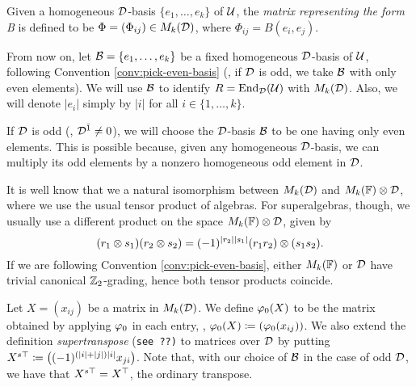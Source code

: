 \begin{defi}
    Given a homogeneous $\mathcal{D}$-basis $\{e_1, \ldots, e_k\}$ of $\mathcal U$, the \emph{matrix representing the form B} is defined to be $\Phi = (\Phi_{ij}) \in M_k(\mathcal{D})$, where $\Phi_{ij} = B(e_i, e_j)$.
\end{defi}

From now on, let $\mathcal B = \{e_1, \ldots, e_k\}$ be a fixed homogeneous $\mathcal{D}$-basis of $\mathcal U$, following Convention \ref{conv:pick-even-basis} (\ie, if $\mathcal{D}$ is odd, we take $\mathcal B$ with only even elements). 
We will use $\mathcal B$ to identify $R = \operatorname{End}_{\mathcal{D}} (\mathcal U)$ with $M_k (\mathcal{D})$. 
Also, we will denote $|e_i|$ simply by $|i|$ for all $i \in \{1, \ldots, k\}$. 



\begin{convention}\label{conv:pick-even-basis}
    If $\mathcal{D}$ is odd (\ie, $\mathcal{D}^{\bar1} \neq 0$), we will choose the $\mathcal{D}$-basis $\mathcal B$ to be one having only even elements. 
    This is possible because, given any homogeneous $\mathcal{D}$-basis, we can multiply its odd elements by a nonzero homogeneous odd element in $\mathcal{D}$. 
\end{convention}

\begin{remark}
    It is well know that we a natural isomorphism between $M_k(\mathcal{D})$ and $M_k(\mathbb{F})\otimes \mathcal{D}$, where we use the usual tensor product of algebras. 
    For superalgebras, though, we usually use a different product on the space $M_k(\mathbb{F})\otimes \mathcal{D}$, given by \[(r_1 \otimes s_1) (r_2 \otimes s_2) = (-1)^{|r_2||s_1|} (r_1 r_2) \otimes (s_1 s_2).\] 
    If we are following Convention \ref{conv:pick-even-basis}, either $M_k(\mathbb{F})$ or $\mathcal{D}$ have trivial canonical $\mathbb{Z}_2$-grading, hence both tensor products coincide.
\end{remark}

\begin{defi}
    Let $X = (x_{ij})$ be a matrix in $M_k (\mathcal{D})$. 
    We define $\varphi_0 (X)$ to be the matrix obtained by applying $\varphi_0$ in each entry, \ie, $\varphi_0 (X) \coloneqq (\varphi_0(x_{ij}))$. 
    We also extend the definition \emph{supertranspose} {(\tt see ??)} to matrices over $\mathcal{D}$ by putting $X^{s\top} \coloneqq \big((-1)^{(|i| + |j|) |i|} x_{ji} \big)$. 
    Note that, with our choice of $\mathcal B$ in the case of odd $\mathcal{D}$, we have that $X^{s\top} = X^{\top}$, the ordinary transpose.
\end{defi}


